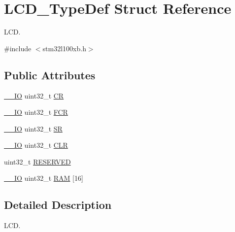 \hypertarget{struct_l_c_d___type_def}{\section{L\-C\-D\-\_\-\-Type\-Def Struct Reference}
\label{struct_l_c_d___type_def}
}


L\-C\-D.  




{\ttfamily \#include $<$stm32l100xb.\-h$>$}

\subsection*{Public Attributes}
\begin{DoxyCompactItemize}
\item 
\hyperlink{core__sc300_8h_aec43007d9998a0a0e01faede4133d6be}{\-\_\-\-\_\-\-I\-O} uint32\-\_\-t \hyperlink{struct_l_c_d___type_def_a10f3d5e534f8a6f59a2dcf9d897fba22}{C\-R}
\item 
\hyperlink{core__sc300_8h_aec43007d9998a0a0e01faede4133d6be}{\-\_\-\-\_\-\-I\-O} uint32\-\_\-t \hyperlink{struct_l_c_d___type_def_a3caccc4b0b894d7b27ed5a4d508154ea}{F\-C\-R}
\item 
\hyperlink{core__sc300_8h_aec43007d9998a0a0e01faede4133d6be}{\-\_\-\-\_\-\-I\-O} uint32\-\_\-t \hyperlink{struct_l_c_d___type_def_ad54495b57709dac1909e1f90d147606b}{S\-R}
\item 
\hyperlink{core__sc300_8h_aec43007d9998a0a0e01faede4133d6be}{\-\_\-\-\_\-\-I\-O} uint32\-\_\-t \hyperlink{struct_l_c_d___type_def_a426998a4ef847067fbc78606e2464e4b}{C\-L\-R}
\item 
uint32\-\_\-t \hyperlink{struct_l_c_d___type_def_a556dfa8484476079c2ab593766754d02}{R\-E\-S\-E\-R\-V\-E\-D}
\item 
\hyperlink{core__sc300_8h_aec43007d9998a0a0e01faede4133d6be}{\-\_\-\-\_\-\-I\-O} uint32\-\_\-t \hyperlink{struct_l_c_d___type_def_acbaed6a4bbcb966ba474d562bb652e57}{R\-A\-M} \mbox{[}16\mbox{]}
\end{DoxyCompactItemize}


\subsection{Detailed Description}
L\-C\-D. 

